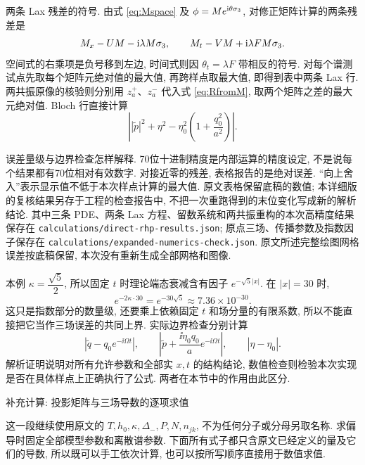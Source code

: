 \par\smallskip\noindent 两条 Lax 残差的符号.\quad
由式 \eqref{eq:Mspace} 及 $\phi=Me^{\mathrm{i}\theta\sigma_3}$, 对修正矩阵计算的两条残差是
\begin{equation*}
M_x-UM-\mathrm{i}\lambda M\sigma_3,\qquad
M_t-VM+\mathrm{i}\lambda F M\sigma_3.
\end{equation*}
空间式的右乘项是负号移到左边, 时间式则因 $\theta_t=\lambda F$ 带相反的符号. 对每个谱测试点先取每个矩阵元绝对值的最大值, 再跨样点取最大值, 即得到表中两条 Lax 行. 两共振原像的核验则分别用 $z_a^+$、$z_a^-$ 代入式 \eqref{eq:RfromM}, 取两个矩阵之差的最大元绝对值. Bloch 行直接计算
\begin{equation*}
\left||\widetilde p|^2+\eta^2-
\eta_0^2\left(1+\dfrac{q_0^2}{a^2}\right)\right|.
\end{equation*}

\par\smallskip\noindent 误差量级与边界检查怎样解释.\quad
70位十进制精度是内部运算的精度设定, 不是说每个结果都有70位相对有效数字. 对接近零的残差, 表格报告的是绝对误差. ``向上舍入''表示显示值不低于本次样点计算的最大值. 原文表格保留底稿的数值; 本详细版的复核结果另存于工程的检查报告中, 不把一次重跑得到的末位变化写成新的解析结论.
其中三条 PDE、两条 Lax 方程、留数系统和两共振重构的本次高精度结果保存在
\texttt{calculations/direct-rhp-results.json}; 原点三场、传播参数及指数因子保存在
\texttt{calculations/expanded-numerics-check.json}. 原文所述完整绘图网格误差按底稿保留, 本次没有重新生成全部网格和图像.

本例 $\kappa=\dfrac{\sqrt{5}}{2}$, 所以固定 $t$ 时理论端态衰减含有因子 $e^{-\sqrt{5}|x|}$. 在 $|x|=30$ 时,
\begin{equation*}
e^{-2\kappa\cdot30}=e^{-30\sqrt{5}}\approx7.36\times10^{-30}.
\end{equation*}
这只是指数部分的数量级, 还要乘上依赖固定 $t$ 和场分量的有限系数, 所以不能直接把它当作三场误差的共同上界. 实际边界检查分别计算
\begin{equation*}
|\widetilde q-q_0e^{-\ii\Omega t}|,\qquad
\left|\widetilde p+\dfrac{\ii\eta_0q_0}{a}e^{-\ii\Omega t}\right|,\qquad
|\eta-\eta_0|.
\end{equation*}
解析证明说明对所有允许参数和全部实 $x,t$ 的结构结论, 数值检查则检验本次实现是否在具体样点上正确执行了公式. 两者在本节中的作用由此区分.

\par\medskip\noindent 补充计算: 投影矩阵与三场导数的逐项求值\par
这一段继续使用原文的 $T,h_0,\kappa,\Delta_-,P,N,n_{jk}$, 不为任何分子或分母另取名称. 求偏导时固定全部模型参数和离散谱参数. 下面所有式子都只含原文已经定义的量及它们的导数, 所以既可以手工依次计算, 也可以按所写顺序直接用于数值求值.

